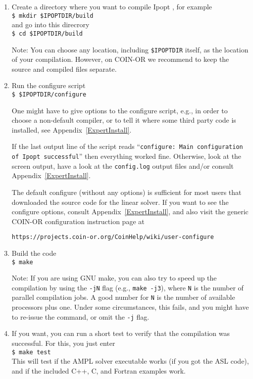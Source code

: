 \documentclass[10pt]{article}
\newcommand{\Ipopt}{{\sc Ipopt }}
\begin{document}
\begin{enumerate}
\item Create a directory where you want to compile \Ipopt, for example\\
  {\tt \$ mkdir \$IPOPTDIR/build}\\
  and go into this direcrory\\
  {\tt \$ cd \$IPOPTDIR/build}

  Note: You can choose any location, including {\tt \$IPOPTDIR}
  itself, as the location of your compilation.  However, on COIN-OR we
  recommend to keep the source and compiled files separate.

\item Run the configure script\\
  {\tt \$ \$IPOPTDIR/configure}

  One might have to give options to the configure script, e.g., in
  order to choose a non-default compiler, or to tell it where some
  third party code is installed, see Appendix~\ref{ExpertInstall}.

  If the last output line of the script reads ``\texttt{configure:
    Main configuration of Ipopt successful}'' then everything worked
  fine.  Otherwise, look at the screen output, have a look at the
  \texttt{config.log} output files and/or consult
  Appendix~\ref{ExpertInstall}.

  The default configure (without any options) is sufficient for most
  users that downloaded the source code for the linear solver. If you
  want to see the configure options, consult
  Appendix~\ref{ExpertInstall}, and also visit the generic COIN-OR
  configuration instruction page at

  \centerline{\texttt{https://projects.coin-or.org/CoinHelp/wiki/user-configure}}

\item Build the code \\
  {\tt \$ make}

  Note: If you are using GNU make, you can also try to speed up the
  compilation by using the {\tt -jN} flag (e.g., {\tt make -j3}),
  where {\tt N} is the number of parallel compilation jobs.  A good
  number for {\tt N} is the number of available processors plus one.
  Under some circumstances, this fails, and you might have to re-issue
  the command, or omit the {\tt -j} flag.
\item If you want, you can run a short test to verify that the
  compilation was successful.  For this, you just
  enter\\
  {\tt \$ make test}\\
  This will test if the AMPL solver executable works (if you got the
  ASL code), and if the included C++, C, and Fortran examples work.


\end{enumerate}
\end{document}
